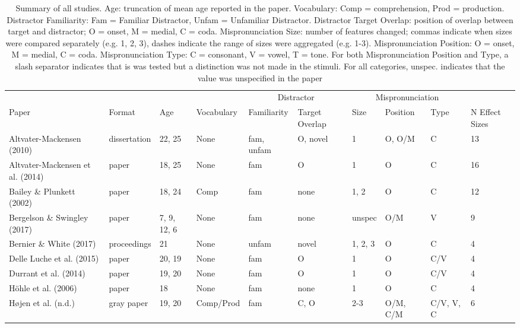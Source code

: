 \documentclass[man]{apa6}
\makeatletter
\newenvironment{lltable}{\begin{landscape}\begin{center}\begin{ThreePartTable}}{\end{ThreePartTable}\end{center}\end{landscape}}
\newcommand\LastLTentrywidth{1em}
\newlength\longtablewidth
\newcommand{\getlongtablewidth}{\begingroup \ifcsname LT@\roman{LT@tables}\endcsname \global\longtablewidth=0pt \renewcommand{\LT@entry}[2]{\global\advance\longtablewidth by ##2\relax\gdef\LastLTentrywidth{##2}}\@nameuse{LT@\roman{LT@tables}} \fi \endgroup}
\theoremstyle{definition}
\theoremstyle{definition}
\theoremstyle{definition}
\theoremstyle{remark}
\makeatother
\begin{document}
\begin{lltable}


\scriptsize{
\begin{longtable}{llllllllll}\noalign{\getlongtablewidth\global\LTcapwidth=\longtablewidth}
\caption{\label{tab:SummaryTable}Summary of all studies. Age: truncation of mean age reported in the paper. Vocabulary: Comp = comprehension, Prod = production. Distractor Familiarity: Fam = Familiar Distractor, Unfam = Unfamiliar Distractor. Distractor Target Overlap: position of overlap between target and distractor; O = onset, M = medial, C = coda. Mispronunciation Size: number of features changed; commas indicate when sizes were compared separately (e.g. 1, 2, 3), dashes indicate the range of sizes were aggregated (e.g. 1-3). Mispronunciation Position: O = onset, M = medial, C = coda. Mispronunciation Type: C = consonant, V = vowel, T = tone. For both Mispronunciation Position and Type, a slash separator indicates that is was tested but a distinction was not made in the stimuli. For all categories, unspec. indicates that the value was unspecified in the paper}\\
\toprule
 &  &  &  & \multicolumn{2}{c}{Distractor} & \multicolumn{3}{c}{Mispronunciation}  &\\
\cmidrule(r){5-6} \cmidrule(r){7-9}
Paper & Format & Age & Vocabulary & Familiarity & Target Overlap & Size & Position & Type & N Effect Sizes\\
\midrule
Altvater-Mackensen (2010) & dissertation & 22, 25 & None & fam, unfam & O, novel & 1 & O, O/M & C & 13\\
Altvater-Mackensen et al. (2014) & paper & 18, 25 & None & fam & O & 1 & O & C & 16\\
Bailey \& Plunkett (2002) & paper & 18, 24 & Comp & fam & none & 1, 2 & O & C & 12\\
Bergelson \& Swingley (2017) & paper & 7, 9, 12, 6 & None & fam & none & unspec & O/M & V & 9\\
Bernier \& White (2017) & proceedings & 21 & None & unfam & novel & 1, 2, 3 & O & C & 4\\
Delle Luche et al. (2015) & paper & 20, 19 & None & fam & O & 1 & O & C/V & 4\\
Durrant et al. (2014) & paper & 19, 20 & None & fam & O & 1 & O & C/V & 4\\
Höhle et al. (2006) & paper & 18 & None & fam & none & 1 & O & C & 4\\
Højen et al. (n.d.) & gray paper & 19, 20 & Comp/Prod & fam & C, O & 2-3 & O/M, C/M & C/V, V, C & 6\\

\end{longtable}}
\end{lltable}
\end{document}
